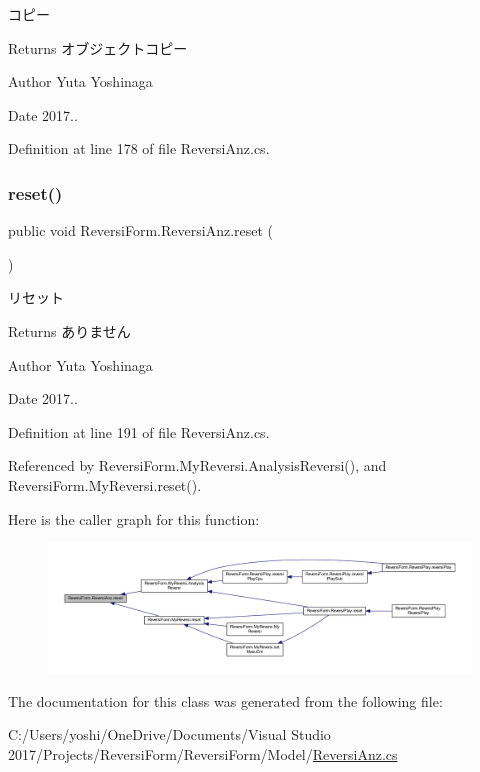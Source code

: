 コピー 

\begin{DoxyReturn}{Returns}
オブジェクトコピー 
\end{DoxyReturn}
\begin{DoxyAuthor}{Author}
Yuta Yoshinaga 
\end{DoxyAuthor}
\begin{DoxyDate}{Date}
2017.. 
\end{DoxyDate}


Definition at line 178 of file Reversi\+Anz.\+cs.

\mbox{\label{class_reversi_form_1_1_reversi_anz_a2428d6f4fd60b95d28876b1f0f8ce151}} 
\subsubsection{\texorpdfstring{reset()}{reset()}}
{\footnotesize\ttfamily public void Reversi\+Form.\+Reversi\+Anz.\+reset (\begin{DoxyParamCaption}{ }\end{DoxyParamCaption})}



リセット 

\begin{DoxyReturn}{Returns}
ありません 
\end{DoxyReturn}
\begin{DoxyAuthor}{Author}
Yuta Yoshinaga 
\end{DoxyAuthor}
\begin{DoxyDate}{Date}
2017.. 
\end{DoxyDate}


Definition at line 191 of file Reversi\+Anz.\+cs.



Referenced by Reversi\+Form.\+My\+Reversi.\+Analysis\+Reversi(), and Reversi\+Form.\+My\+Reversi.\+reset().

Here is the caller graph for this function\+:
\nopagebreak
\begin{figure}[H]
\begin{center}
\leavevmode
\includegraphics[width=350pt]{class_reversi_form_1_1_reversi_anz_a2428d6f4fd60b95d28876b1f0f8ce151_icgraph}
\end{center}
\end{figure}


The documentation for this class was generated from the following file\+:\begin{DoxyCompactItemize}
\item 
C\+:/\+Users/yoshi/\+One\+Drive/\+Documents/\+Visual Studio 2017/\+Projects/\+Reversi\+Form/\+Reversi\+Form/\+Model/\hyperlink{_reversi_anz_8cs}{Reversi\+Anz.\+cs}\end{DoxyCompactItemize}
